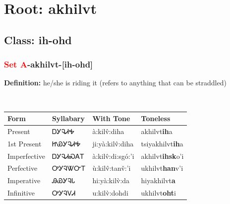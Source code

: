 \needspace{4in}
\section*{Root: akhilvt}
\nopagebreak
{}
\needspace{3in}
\subsection*{Class: ih-ohd}
\nopagebreak
\needspace{2in}
\subsubsection*{\textcolor{Red}{Set A}{-}\textbf{akhilvt}{-}[ih-ohd]}
\nopagebreak
\textbf{Definition: } he/she is riding it (refers to anything that can be straddled)
\\[0.5em]
\begin{tabularx}{\textwidth}{l X X X}%
\toprule%
\textbf{Form}&\textbf{Syllabary}&\textbf{With Tone}&\textbf{Toneless}\\%
\midrule%
Present&ᎠᎩᎸᏗᎭ&à:kilv̂:diha&akhilvt\textbf{ih}a\\%
1st Present&ᏥᏯᎩᎸᏗᎭ&ji:yà:kilv̂:diha&tsiyakhilvt\textbf{ih}a\\%
Imperfective&ᎠᎩᎸᏗᏍᎪᎢ&à:kilv̂:di:sgó:’i&akhilvt\textbf{ihsk}o'i\\%
Perfective&ᎤᎩᎸᏔᏅᎢ&ù:kilv̂:tanv̌:’i&ukhilvt\textbf{han}v'i\\%
Imperative&ᎯᏯᎩᎸᏓ&hi:yà:kilv̀:da&hiyakhilvt\textbf{a}\\%
Infinitive&ᎤᎩᎸᏙᏗ&u:kilv̀:dohdi&ukhilvt\textbf{oht}i\\%
\bottomrule%
\end{tabularx}
\\[1em]
